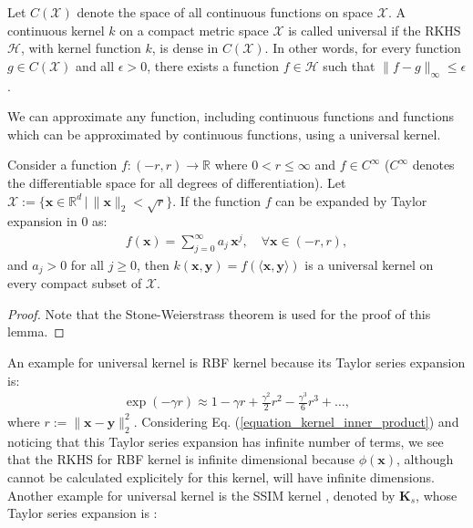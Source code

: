\documentclass[lang=cn,10pt]{gorgeousnbook}
\numberwithin{equation}{section}%
\numberwithin{figure}{section}%
\begin{document}

\begin{definition}
Let $C(\mathcal{X})$ denote the space of all continuous functions on space $\mathcal{X}$. A continuous kernel $k$ on a compact metric space $\mathcal{X}$ is called universal if the RKHS $\mathcal{H}$, with kernel function $k$, is dense in $C(\mathcal{X})$. In other words, for every function $g \in C(\mathcal{X})$ and all $\epsilon > 0$, there exists a function $f \in \mathcal{H}$ such that $\|f - g\|_\infty \leq \epsilon$.
\end{definition}

\begin{remark}
We can approximate any function, including continuous functions and functions which can be approximated by continuous functions, using a universal kernel. 
\end{remark}

\begin{lemma}
Consider a function $f : (-r, r) \rightarrow \mathbb{R}$ where $0 < r \leq \infty$ and $f \in C^\infty$ ($C^\infty$ denotes the differentiable space for all degrees of differentiation). Let $\mathcal{X} := \{\boldsymbol{x} \in \mathbb{R}^d\, |\, \|\boldsymbol{x}\|_2 < \sqrt{r}\}$. If the function $f$ can be expanded by Taylor expansion in $0$ as:
\begin{align}
f(\boldsymbol{x}) = \sum_{j=0}^\infty a_j\, \boldsymbol{x}^j, \quad \forall \boldsymbol{x} \in (-r, r),
\end{align}
and $a_j > 0$ for all $j \geq 0$, then $k(\boldsymbol{x}, \boldsymbol{y}) = f(\langle \boldsymbol{x}, \boldsymbol{y} \rangle)$ is a universal kernel on every compact subset of $\mathcal{X}$. 
\end{lemma}
\begin{proof}
Note that the Stone-Weierstrass theorem \cite{de1959stone} is used for the proof of this lemma.
\end{proof}
An example for universal kernel is RBF kernel because its Taylor series expansion is:
\begin{align*}
\exp(-\gamma r) \approx 1 - \gamma r + \frac{\gamma^2}{2} r^2 - \frac{\gamma^3}{6} r^3 + \dots,
\end{align*}
where $r := \|\boldsymbol{x} - \boldsymbol{y}\|_2^2$.
Considering Eq. (\ref{equation_kernel_inner_product}) and noticing that this Taylor series expansion has infinite number of terms, we see that the RKHS for RBF kernel is infinite dimensional because $\phi(\boldsymbol{x})$, although cannot be calculated explicitely for this kernel, will have infinite dimensions. 
Another example for universal kernel is the SSIM kernel \cite{ghojogh2020theoretical}, denoted by $\boldsymbol{K}_s$, whose Taylor series expansion is \cite{ghojogh2019image}:
\end{document}
